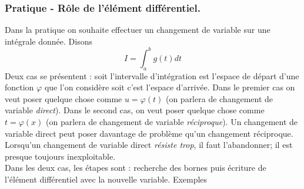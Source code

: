 \subsubsection{Pratique - Rôle de l'élément différentiel.}
Dans la pratique on souhaite effectuer un changement de variable sur une intégrale donnée. Disons
\begin{displaymath}
 I = \int_{a}^{b}g(t)dt
\end{displaymath}
Deux cas se présentent : soit l'intervalle d'intégration est l'espace de départ d'une fonction $\varphi$ que l'on considère soit c'est l'espace d'arrivée. Dans le premier cas on veut poser quelque chose comme $u=\varphi(t)$ (on parlera de changement de variable \emph{direct}). Dans le second cas, on veut poser quelque chose comme $t=\varphi(x)$ (on parlera de changement de variable \emph{réciproque}). Un changement de variable direct peut poser davantage de problème qu'un changement réciproque. Lorsqu'un changement de variable direct \og\emph{résiste trop}\fg, il faut l'abandonner; il est presque toujours inexploitable.\\
Dans les deux cas, les étapes sont : recherche des bornes puis écriture de l'élément différentiel avec la nouvelle variable.\newline
Exemples
